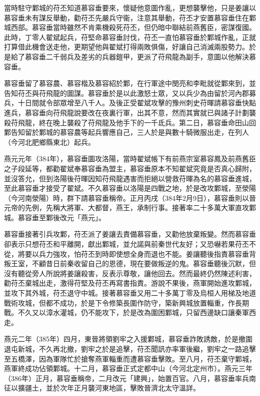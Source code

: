 當時駐守鄴城的苻丕知道慕容垂要來，懷疑他意圖作亂，更想襲擊他，只是姜讓以慕容垂未有謀反舉動，勸苻丕先嚴兵守衞，注意其舉動，苻丕才安置慕容垂住在鄴城西部。慕容垂當時雖然不肯乘機殺死苻丕，但仍暗中聯結前燕舊臣，密謀復國。此時，丁零人翟斌起兵，苻堅命慕容垂討伐，苻丕一直怕慕容垂於鄴城作亂，正就打算借此機會送走他，更期望他與翟斌打得兩敗俱傷，好讓自己消滅兩股勢力。於是給了慕容垂二千弱兵及差劣的兵器鎧甲，更派了苻飛龍為副手，意圖以他解決慕容垂。

慕容垂留了慕容農、慕容楷及慕容紹於鄴，在行軍途中閔亮和李毗就從鄴來到，並告知苻丕與苻飛龍的圖謀。慕容垂於是以此激怒士眾，又以兵少為由留於河內郡募兵，十日間就令部眾增至八千人。及後正受翟斌攻擊的豫州刺史苻暉請慕容垂快點進兵，慕容垂向苻飛龍說要改在夜裏行軍，出其不意，然而其實就已與諸子計劃襲殺苻飛龍，終在晚上襲殺了苻飛龍及他手下的一千氐兵。第二日，慕容垂命田山回鄴告知留於鄴城的慕容農等起兵響應自己，三人於是與數十騎微服出走，在列人（今河北肥鄉縣東北）起兵。

燕元元年（384年），慕容垂圖攻洛陽，當時翟斌帳下有前燕宗室慕容鳳及前燕舊臣之子段延等，都勸翟斌奉慕容垂為盟主，慕容垂原本不知翟斌究竟是否真心歸附，並沒答允，但到洛陽後苻暉因知苻飛龍遇害而拒絕以營救苻暉為名的慕容垂進城，至此慕容垂才接受了翟斌。不久慕容垂以洛陽是四戰之地，於是改攻鄴城，至滎陽（今河南滎陽）時，群下請慕容垂稱帝。正月丙戌（384年2月9日），慕容垂則以晉元帝的先例，先稱大將軍、大都督，燕王，承制行事。接著率二十多萬大軍直攻鄴城。慕容垂至鄴後改元「燕元」。

慕容垂接著引兵攻鄴，苻丕派了姜讓去責備慕容垂，又勸他放棄叛變。然而慕容垂卻表示只想苻丕和平離開，獻出鄴城，並允諾與前秦世代友好；又恐嚇若果苻丕不從，將要以兵力強攻，怕苻丕到時即使想全身而退也不能。姜讓聽後指責慕容垂背叛王室，不顧昔日前秦收留自己的恩德，現在要做叛逆的鬼。慕容垂聽後沉默，但沒有聽從旁人所說將姜讓殺害，反表示尊敬，讓他回去。然而最終仍然陳述利害，勸苻丕棄城出走，激得苻堅及苻丕再寫書指責。游說不果後，燕軍開始進攻鄴城，並攻下其外城，苻丕退守中城。接著慕容垂又用二十多萬丁零及烏桓人用梯及地道戰術攻城，但都不成功，於是下令修築長圍作防守，築新興城放置輜重，作長期戰。不久又以漳水灌城，仍不能攻下，於是改為圍困鄴城，只留西邊缺口讓秦軍西走。

燕元二年（385年）四月，東晉將領劉牢之入援鄴城，慕容垂詐敗誘敵，於是撤圍退屯新城，不久再北撤，劉牢之於是追擊，苻丕聞訊亦率軍後繼，劉牢之一路追擊至五橋澤，因為軍隊忙於搶奪燕軍輜重而遭慕容垂擊敗。至八月，苻丕棄守鄴城，燕軍終成功佔領鄴城。十二月，慕容垂正式定都中山（今河北定州市）。燕元三年（386年）正月，慕容垂稱帝，二月改元「建興」，始置百官。八月，慕容垂率兵南征以擴疆土，並於次年正月襲河東地區，擊敗晉濟北太守溫詳。

